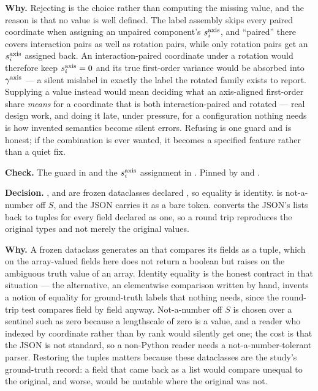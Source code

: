 \textbf{Why.} Rejecting is the choice rather than computing the missing value,
and the reason is that no value is well defined. The label assembly skips every
paired coordinate when assigning an unpaired component's $s_{i}^{\mathrm{axis}}$, and
``paired'' there covers interaction pairs as well as rotation pairs, while only
rotation pairs get an $s_{i}^{\mathrm{axis}}$ assigned back. An interaction-paired
coordinate under a rotation would therefore keep $s_{i}^{\mathrm{axis}}=0$ and its true
first-order variance would be absorbed into $\gamma^{\mathrm{axis}}$ --- a silent mislabel in
exactly the label the rotated family exists to report. Supplying a value
instead would mean deciding what an axis-aligned first-order share
\emph{means} for a coordinate that is both interaction-paired and rotated ---
real design work, and doing it late, under pressure, for a configuration
nothing needs is how invented semantics become silent errors. Refusing is one guard and is honest;
if the combination is ever wanted, it becomes a specified feature rather than a
quiet fix.

\begin{sloppypar}
\textbf{Check.} The guard in  and the
$s_{i}^{\mathrm{axis}}$ assignment in . Pinned
by  and
.
\end{sloppypar}

\label{app:so:a4:r4}

\textbf{Decision.} ,  and
 are frozen dataclasses declared , so
equality is identity.  is not-a-number off $S$, and the JSON
carries it as a bare  token.  converts the JSON's
lists back to tuples for every field declared as one, so a round trip
reproduces the original types and not merely the original values.

\textbf{Why.} A frozen dataclass generates an  that compares
its fields as a tuple, which on the array-valued fields here does not return a
boolean but raises on the ambiguous truth value of an array. Identity equality
is the honest contract in that situation --- the alternative, an elementwise
comparison written by hand, invents a notion of equality for ground-truth
labels that nothing needs, since the round-trip test compares field by field
anyway. Not-a-number off $S$ is chosen over a sentinel such as zero because a
lengthscale of zero is a value, and a reader who indexed by coordinate rather
than by rank would silently get one; the cost is that the JSON is not standard,
so a non-Python reader needs a not-a-number-tolerant parser. Restoring the
tuples matters because these dataclasses are the study's ground-truth record: a
field that came back as a list would compare unequal to the original, and
worse, would be mutable where the original was not.

